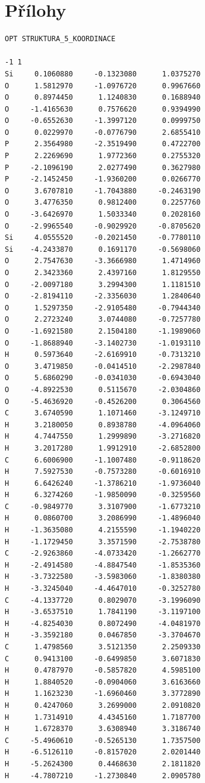 \documentclass[
digital, %
table,   %
nolof,     %
nolot,     %
oneside,
]{fithesis3}
\begin{document}
\chapter{Přílohy}
\begin{lstlisting}[frame=single, caption={struktura koordinace 5},label=DescriptiveLabel]
OPT STRUKTURA_5_KOORDINACE

-1 1
Si     0.1060880     -0.1323080      1.0375270
O      1.5812970     -1.0976720      0.9967660
O      0.8974450      1.1240830      0.1688940
O     -1.4165630      0.7576620      0.9394990
O     -0.6552630     -1.3997120      0.0999750
O      0.0229970     -0.0776790      2.6855410
P      2.3564980     -2.3519490      0.4722700
P      2.2269690      1.9772360      0.2755320
P     -2.1096190      2.0277490      0.3627980
P     -2.1452450     -1.9360200      0.0266770
O      3.6707810     -1.7043880     -0.2463190
O      3.4776350      0.9812400      0.2257760
O     -3.6426970      1.5033340      0.2028160
O     -2.9965540     -0.9029920     -0.8705620
Si     4.0555520     -0.2021450     -0.7780110
Si    -4.2433870      0.1691170     -0.5698060
O      2.7547630     -3.3666980      1.4714960
O      2.3423360      2.4397160      1.8129550
O     -2.0097180      3.2994300      1.1181510
O     -2.8194110     -2.3356030      1.2840640
O      1.5297350     -2.9105480     -0.7944340
O      2.2723240      3.0744080     -0.7257780
O     -1.6921580      2.1504180     -1.1989060
O     -1.8688940     -3.1402730     -1.0193110
H      0.5973640     -2.6169910     -0.7313210
O      3.4719850     -0.0414510     -2.2987840
O      5.6860290     -0.0341030     -0.6943040
O     -4.8922530      0.5115670     -2.0304860
O     -5.4636920     -0.4526200      0.3064560
C      3.6740590      1.1071460     -3.1249710
H      3.2180050      0.8938780     -4.0964060
H      4.7447550      1.2999890     -3.2716820
H      3.2017280      1.9912910     -2.6852800
C      6.6006900     -1.1007480     -0.9118620
H      7.5927530     -0.7573280     -0.6016910
H      6.6426240     -1.3786210     -1.9736040
H      6.3274260     -1.9850090     -0.3259560
C     -0.9849770      3.3107900     -1.6773210
H      0.0860700      3.2086990     -1.4896040
H     -1.3635080      4.2155590     -1.1940220
H     -1.1729450      3.3571590     -2.7538780
C     -2.9263860     -4.0733420     -1.2662770
H     -2.4914580     -4.8847540     -1.8535360
H     -3.7322580     -3.5983060     -1.8380380
H     -3.3245040     -4.4647010     -0.3252780
C     -4.1337720      0.8029070     -3.1996090
H     -3.6537510      1.7841190     -3.1197100
H     -4.8254030      0.8072490     -4.0481970
H     -3.3592180      0.0467850     -3.3704670
C      1.4798560      3.5121350      2.2509330
C      0.9413100     -0.6499850      3.6071830
H      0.4787970     -0.5857820      4.5985100
H      1.8840520     -0.0904060      3.6163660
H      1.1623230     -1.6960460      3.3772890
H      0.4247060      3.2699000      2.0910820
H      1.7314910      4.4345160      1.7187700
H      1.6728370      3.6308940      3.3186740
C     -5.4960610     -0.5265130      1.7357500
H     -6.5126110     -0.8157020      2.0201440
H     -5.2624300      0.4468630      2.1811820
H     -4.7807210     -1.2730840      2.0905780

\end{lstlisting}
\end{document}
